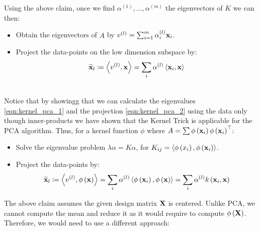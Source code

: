 Using the above claim, once we find $\alpha^{\left(1\right)},\ldots,\alpha^{\left(m\right)}$ the eigenvectors of $K$ we can then:
\begin{itemize}
	\item Obtain the eigenvectors of $A$ by $ v^{\left(l\right)}=\sum_{i=1}^m \alpha_i^{\left(l\right)}\mathbf{x}_i $.
	\item Project the data-points on the low dimension subspace by: 
	\begin{equation}
	\widetilde{\mathbf{x}}_l \coloneqq \left\langle v^{\left(l\right)},\mathbf{x}\right\rangle = \sum_i \alpha^{\left(l\right)}\left\langle \mathbf{x}_i,\mathbf{x}\right\rangle
	\label{eqn:kernel_pca_2}
	\end{equation}
\end{itemize}

~\\Notice that by showingg that we can calculate the eigenvalues \ref{eqn:kernel_pca_1} and the projection \ref{eqn:kernel_pca_2} using the data only though inner-products we have shown that the Kernel Trick is applicable for the PCA algorithm. Thus, for a kernel function $\phi$ where $A=\sum\phi\left(\mathbf{x}_i\right)\phi\left(\mathbf{x}_i\right)^\top$:
~\\\begin{itemize}
	\item Solve the eigenvalue problem $\lambda\alpha = K\alpha$, for $K_{ij} = \left\langle \phi\left(x_i\right),\phi\left(\mathbf{x}_i\right)\right\rangle$.
	\item Project the data-points by: $$	\widetilde{\mathbf{x}}_l \coloneqq \left\langle v^{\left(l\right)},\phi\left(\mathbf{x}\right)\right\rangle = \sum_i \alpha^{\left(l\right)}\left\langle \phi\left(\mathbf{x}_i\right),\phi\left(\mathbf{x}\right)\right\rangle = \sum_i \alpha^{\left(l\right)} k\left(\mathbf{x}_i,\mathbf{x}\right) $$
\end{itemize}

The above claim assumes the given design matrix $\mathbf{X}$ is centered. Unlike PCA, we cannot compute the mean and reduce it as it would require to compute $\phi\left(\mathbf{X}\right)$. Therefore, we would need to use a different approach:


